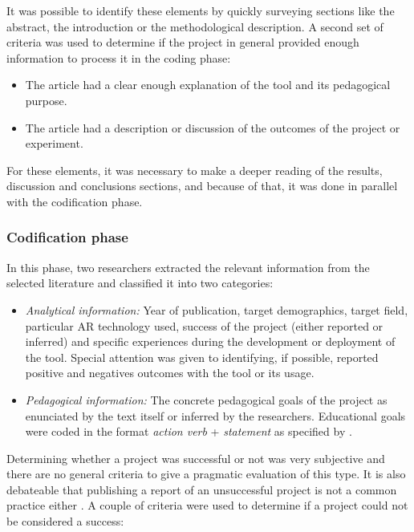 It was possible to identify these elements by quickly surveying sections like the abstract, the introduction or the methodological description. A second set of criteria was used to
determine if the project in general provided enough information to process it in the coding phase:

\begin{itemize}
    \item The article had a clear enough explanation of the tool and its pedagogical purpose.
    \item The article had a description or discussion of the outcomes of the project or experiment.
\end{itemize}

For these elements, it was necessary to make a deeper reading of the results, discussion and conclusions sections, and because of that, it was done in parallel with the codification phase.

\subsubsection{Codification phase \label{sec:2-2-2-3}}

In this phase, two researchers  extracted the relevant information from the selected literature and classified it into two categories:

\begin{itemize}
    \item \emph{Analytical information:} Year of publication, target demographics, target field, particular AR technology used, success of the project (either reported or inferred) and
    specific experiences during the development or deployment of the tool. Special attention was given to identifying, if possible, reported positive and negatives outcomes with the tool
    or its usage.
    \item \emph{Pedagogical information:} The concrete pedagogical goals of the project as enunciated by the text itself or inferred by the researchers. Educational goals were coded in the
    format \emph{action verb} + \emph{statement} as specified by \textcite{fuchs_1982}. 
\end{itemize}

Determining whether a project was successful or not was very subjective and there are no general criteria to give a pragmatic evaluation of this type. It is also debateable that publishing
a report of an unsuccessful project is not a common practice either \parencite{cook_2017,dawson_2018}. A couple of criteria were used to determine if a project could not be considered a
success:

